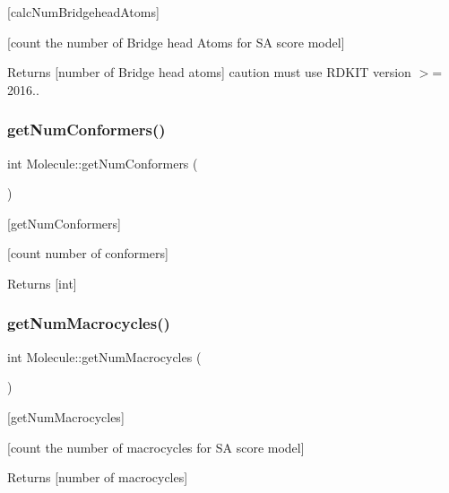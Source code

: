 \mbox{[}calc\+Num\+Bridgehead\+Atoms\mbox{]} 

\mbox{[}count the number of Bridge head Atoms for SA score model\mbox{]} \begin{DoxyReturn}{Returns}
\mbox{[}number of Bridge head atoms\mbox{]} caution must use R\+D\+K\+IT version $>$= 2016.. 
\end{DoxyReturn}
\mbox{\label{class_molecule_a00c23cd635ca82207165e59cdd714d99}} 
\subsubsection{\texorpdfstring{get\+Num\+Conformers()}{getNumConformers()}}
{\footnotesize\ttfamily int Molecule\+::get\+Num\+Conformers (\begin{DoxyParamCaption}{ }\end{DoxyParamCaption})}



\mbox{[}get\+Num\+Conformers\mbox{]} 

\mbox{[}count number of conformers\mbox{]} \begin{DoxyReturn}{Returns}
\mbox{[}int\mbox{]} 
\end{DoxyReturn}
\mbox{\label{class_molecule_a7ae4c6e9458d7874bf43bdfbe079d875}} 
\subsubsection{\texorpdfstring{get\+Num\+Macrocycles()}{getNumMacrocycles()}}
{\footnotesize\ttfamily int Molecule\+::get\+Num\+Macrocycles (\begin{DoxyParamCaption}{ }\end{DoxyParamCaption})}



\mbox{[}get\+Num\+Macrocycles\mbox{]} 

\mbox{[}count the number of macrocycles for SA score model\mbox{]} \begin{DoxyReturn}{Returns}
\mbox{[}number of macrocycles\mbox{]} 
\end{DoxyReturn}
\mbox{\label{class_molecule_ab418ce9c2222f00552c847a14499e282}} 
